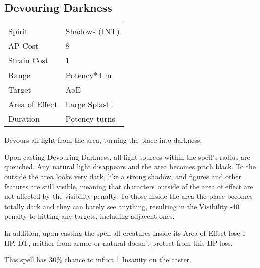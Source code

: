 \documentclass[11pt,a4paper,twocolumn]{book}
\begin{document}



\subsection*{Devouring Darkness}
{
	\begin{tabu} to 75mm{| X[l,4] | X[l,7] |}
		\hline
		Spirit 			& Shadows (INT) 	\\
		AP Cost	      	& 8 				\\
		Strain Cost     & 1 				\\
		Range     		& Potency*4 m		\\
		Target      	& AoE				\\
		Area of Effect  & Large Splash  	 	\\
		Duration     	& Potency turns 	\\ \hline
	\end{tabu}
	
}

\medskip

Devours all light from the area, turning the place into darkness.

Upon casting Devouring Darkness, all light sources within the spell's radius are quenched. Any natural light disappears and the area becomes pitch black. To the outside the area looks very dark, like a strong shadow, and figures and other features are still visible, meaning that characters outside of the area of effect are not affected by the visibility penalty. To those inside the area the place becomes totally dark and they can barely see anything, resulting in the Visibility -40 penalty to hitting any targets, including adjacent ones.

In addition, upon casting the spell all creatures inside its Area of Effect lose 1 HP. DT, neither from armor or natural doesn't protect from this HP loss.

This spell has 30\% chance to inflict 1 Insanity on the caster.
\end{document}
